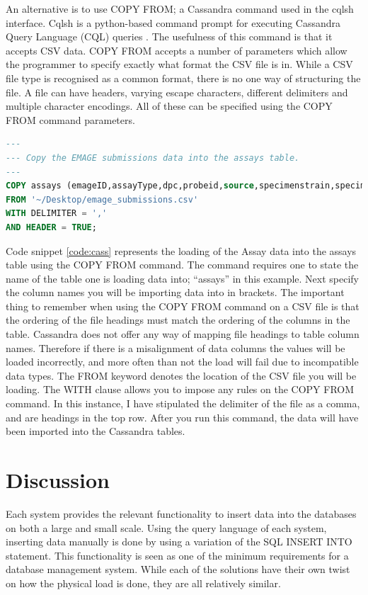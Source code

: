 An alternative is to use COPY FROM; a Cassandra command used in the cqlsh interface. Cqlsh is a python-based command prompt for executing Cassandra Query Language (CQL) queries \cite{ds}. The usefulness of this command is that it accepts CSV data. COPY FROM accepts a number of parameters which allow the programmer to specify exactly what format the CSV file is in. While a CSV file type is recognised as a common format, there is no one way of structuring the file. A file can have headers, varying escape characters, different delimiters and multiple character encodings. All of these can be specified using the COPY FROM command parameters.

\begin{lstlisting}[language=SQL, caption=Loading data into Apache Cassandra using the cqlsh interface., label=code:cass]
---
--- Copy the EMAGE submissions data into the assays table.
---
COPY assays (emageID,assayType,dpc,probeid,source,specimenstrain,specimentype,theilerstage)
FROM '~/Desktop/emage_submissions.csv'
WITH DELIMITER = ','
AND HEADER = TRUE;
\end{lstlisting}

Code snippet \ref{code:cass} represents the loading of the Assay data into the assays table using the COPY FROM command. The command requires one to state the name of the table one is loading data into; ``assays'' in this example. Next specify the column names you will be importing data into in brackets.  The important thing to remember when using the COPY FROM command on a CSV file is that the ordering of the file headings must match the ordering of the columns in the table. Cassandra does not offer any way of mapping file headings to table column names. Therefore if there is a misalignment of data columns the values will be loaded incorrectly, and more often than not the load will fail due to incompatible data types. The FROM keyword denotes the location of the CSV file you will be loading. The WITH clause allows you to impose any rules on the COPY FROM command. In this instance, I have stipulated the delimiter of the file as a comma, and are headings in the top row. After you run this command, the data will have been imported into the Cassandra tables.
\newpage
\section{Discussion}\label{loaddiscussion}
Each system provides the relevant functionality to insert data into the databases on both a large and small scale. Using the query language of each system, inserting data manually is done by using a variation of the SQL INSERT INTO statement. This functionality is seen as one of the minimum requirements for a database management system. While each of the solutions have their own twist on how the physical load is done, they are all relatively similar.

